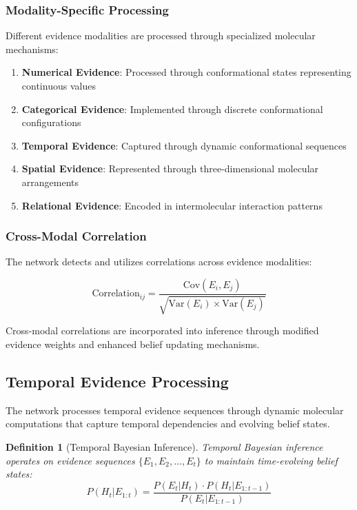 \documentclass[12pt,a4paper]{article}
\newtheorem{definition}[theorem]{Definition}
\begin{document}
\subsubsection{Modality-Specific Processing}

Different evidence modalities are processed through specialized molecular mechanisms:

\begin{enumerate}
\item \textbf{Numerical Evidence}: Processed through conformational states representing continuous values
\item \textbf{Categorical Evidence}: Implemented through discrete conformational configurations
\item \textbf{Temporal Evidence}: Captured through dynamic conformational sequences
\item \textbf{Spatial Evidence}: Represented through three-dimensional molecular arrangements
\item \textbf{Relational Evidence}: Encoded in intermolecular interaction patterns
\end{enumerate}

\subsubsection{Cross-Modal Correlation}

The network detects and utilizes correlations across evidence modalities:

\begin{equation}
\text{Correlation}_{ij} = \frac{\text{Cov}(E_i, E_j)}{\sqrt{\text{Var}(E_i) \times \text{Var}(E_j)}}
\end{equation}

Cross-modal correlations are incorporated into inference through modified evidence weights and enhanced belief updating mechanisms.

\subsection{Temporal Evidence Processing}

The network processes temporal evidence sequences through dynamic molecular computations that capture temporal dependencies and evolving belief states.

\begin{definition}[Temporal Bayesian Inference]
Temporal Bayesian inference operates on evidence sequences $\{E_1, E_2, \ldots, E_t\}$ to maintain time-evolving belief states:
\begin{equation}
P(H_t | E_{1:t}) = \frac{P(E_t | H_t) \cdot P(H_t | E_{1:t-1})}{P(E_t | E_{1:t-1})}
\end{equation}
\end{definition}
\end{document}
